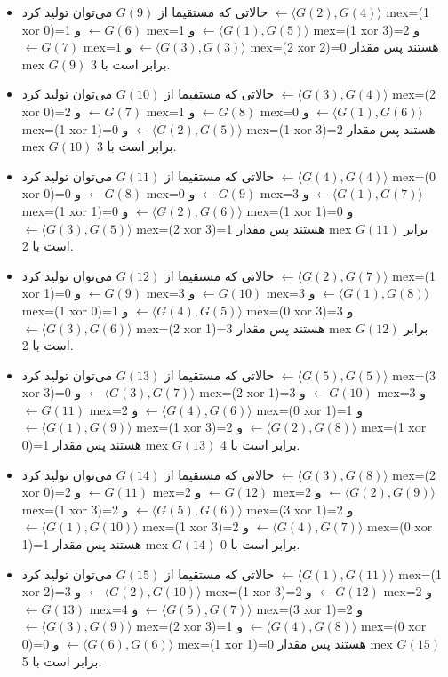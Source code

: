 \begin{solution}
\begin{itemize}
		\item حالاتی که مستقیما از $G(9)$ می‌توان تولید کرد $\leftarrow \langle G(2), G(4) \rangle$ mex=(1 xor 0)=1 و $\leftarrow G(6)$ mex=1 و $\leftarrow \langle G(1), G(5) \rangle$ mex=(1 xor 3)=2 و $\leftarrow G(7)$ mex=1 و $\leftarrow \langle G(3), G(3) \rangle$ mex=(2 xor 2)=0  هستند پس مقدار mex  $G(9)$ برابر است با 3.
		\item حالاتی که مستقیما از $G(10)$ می‌توان تولید کرد $\leftarrow \langle G(3), G(4) \rangle$ mex=(2 xor 0)=2 و $\leftarrow G(7)$ mex=1 و $\leftarrow G(8)$ mex=0 و $\leftarrow \langle G(1), G(6) \rangle$ mex=(1 xor 1)=0 و $\leftarrow \langle G(2), G(5) \rangle$ mex=(1 xor 3)=2  هستند پس مقدار mex  $G(10)$ برابر است با 3.
		\item حالاتی که مستقیما از $G(11)$ می‌توان تولید کرد $\leftarrow \langle G(4), G(4) \rangle$ mex=(0 xor 0)=0 و $\leftarrow G(8)$ mex=0 و $\leftarrow G(9)$ mex=3 و $\leftarrow \langle G(1), G(7) \rangle$ mex=(1 xor 1)=0 و $\leftarrow \langle G(2), G(6) \rangle$ mex=(1 xor 1)=0 و $\leftarrow \langle G(3), G(5) \rangle$ mex=(2 xor 3)=1  هستند پس مقدار mex  $G(11)$ برابر است با 2.
		\item حالاتی که مستقیما از $G(12)$ می‌توان تولید کرد $\leftarrow \langle G(2), G(7) \rangle$ mex=(1 xor 1)=0 و $\leftarrow G(9)$ mex=3 و $\leftarrow G(10)$ mex=3 و $\leftarrow \langle G(1), G(8) \rangle$ mex=(1 xor 0)=1 و $\leftarrow \langle G(4), G(5) \rangle$ mex=(0 xor 3)=3 و $\leftarrow \langle G(3), G(6) \rangle$ mex=(2 xor 1)=3  هستند پس مقدار mex  $G(12)$ برابر است با 2.
		\item حالاتی که مستقیما از $G(13)$ می‌توان تولید کرد $\leftarrow \langle G(5), G(5) \rangle$ mex=(3 xor 3)=0 و $\leftarrow \langle G(3), G(7) \rangle$ mex=(2 xor 1)=3 و $\leftarrow G(10)$ mex=3 و $\leftarrow G(11)$ mex=2 و $\leftarrow \langle G(4), G(6) \rangle$ mex=(0 xor 1)=1 و $\leftarrow \langle G(1), G(9) \rangle$ mex=(1 xor 3)=2 و $\leftarrow \langle G(2), G(8) \rangle$ mex=(1 xor 0)=1  هستند پس مقدار mex  $G(13)$ برابر است با 4.
		\item حالاتی که مستقیما از $G(14)$ می‌توان تولید کرد $\leftarrow \langle G(3), G(8) \rangle$ mex=(2 xor 0)=2 و $\leftarrow G(11)$ mex=2 و $\leftarrow G(12)$ mex=2 و $\leftarrow \langle G(2), G(9) \rangle$ mex=(1 xor 3)=2 و $\leftarrow \langle G(5), G(6) \rangle$ mex=(3 xor 1)=2 و $\leftarrow \langle G(1), G(10) \rangle$ mex=(1 xor 3)=2 و $\leftarrow \langle G(4), G(7) \rangle$ mex=(0 xor 1)=1  هستند پس مقدار mex  $G(14)$ برابر است با 0.
		\item حالاتی که مستقیما از $G(15)$ می‌توان تولید کرد $\leftarrow \langle G(1), G(11) \rangle$ mex=(1 xor 2)=3 و $\leftarrow \langle G(2), G(10) \rangle$ mex=(1 xor 3)=2 و $\leftarrow G(12)$ mex=2 و $\leftarrow G(13)$ mex=4 و $\leftarrow \langle G(5), G(7) \rangle$ mex=(3 xor 1)=2 و $\leftarrow \langle G(3), G(9) \rangle$ mex=(2 xor 3)=1 و $\leftarrow \langle G(4), G(8) \rangle$ mex=(0 xor 0)=0 و $\leftarrow \langle G(6), G(6) \rangle$ mex=(1 xor 1)=0  هستند پس مقدار mex  $G(15)$ برابر است با 5.

\end{itemize}
\end{solution}
